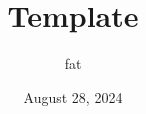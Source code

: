 \documentclass{article}
\title{\textbf{\Huge{Template}}}
\author{\Large{fat}}
\date{August 28, 2024}
\begin{document}
\maketitle
\thispagestyle{fancy}
\renewcommand{\footrulewidth}{0.4pt}
\cfoot{\thepage}
\renewcommand{\headrulewidth}{0.4pt}












\end{document}
